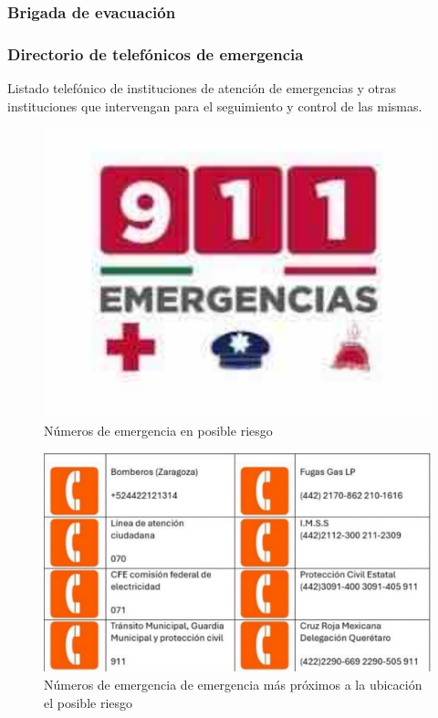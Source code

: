     \subsubsection{Brigada de evacuación}
    
    \subsubsection{Directorio de telefónicos de emergencia}
    
    Listado telefónico de instituciones de atención de emergencias y otras instituciones que intervengan para el seguimiento y control de las mismas.
    
    \begin{figure}[H]
        \centering
        \includegraphics[scale=0.5]{8/Img/911.pdf}
        \caption{Números de emergencia en posible riesgo}
        \label{Numeros de emergencia}
    \end{figure}
    \begin{figure}[H]
        \centering
        \includegraphics[scale=0.3]{8/Img/Directorio.pdf}
        \caption{Números de emergencia de emergencia más próximos a la ubicación el posible riesgo}
        \label{Directorio}
    \end{figure}
